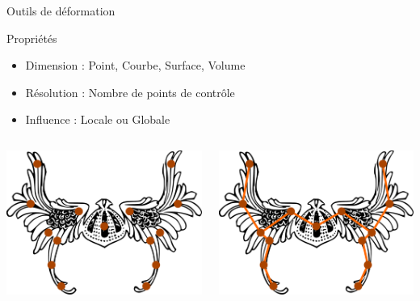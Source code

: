 \documentclass[xcolor=x11names,compress]{beamer}
\renewcommand{\(}{\begin{columns}} \renewcommand{\)}{\end{columns}}
\newcommand{\<}[1]{\begin{column}{#1}} \renewcommand{\>}{\end{column}}
\begin{document}
\begin{frame}{Outils de déformation}
  \begin{exampleblock}{Propriétés}
    \begin{itemize}
      \item Dimension : Point, Courbe, Surface, Volume
      \item Résolution : Nombre de points de contrôle
      \item Influence : Locale ou Globale
    \end{itemize}
  \end{exampleblock}
  \begin{columns}[t]
    \begin{column}{0.3\textwidth}
      \centering
      \includegraphics[scale=0.13]{Outil-Mono-Points}
    \end{column}
    \begin{column}{0.25\textwidth}
      \centering
      \includegraphics[scale=0.13]{Outil-Mono-Courbes}

\end{column}
\end{columns}
\end{frame}
\end{document}
